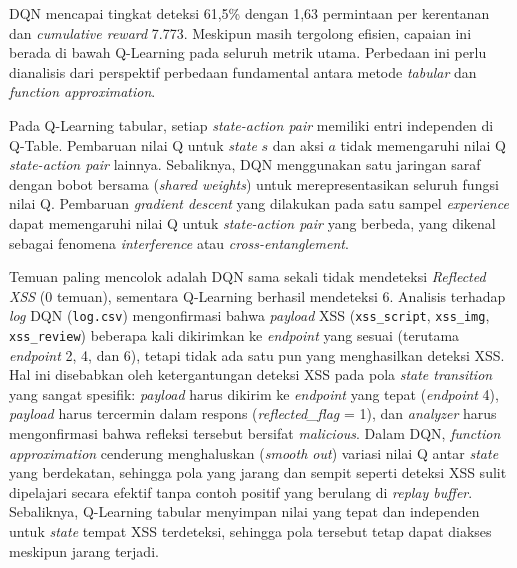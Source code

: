 DQN mencapai tingkat deteksi 61,5\% dengan 1,63 permintaan per kerentanan dan \textit{cumulative reward} 7.773. Meskipun masih tergolong efisien, capaian ini berada di bawah Q-Learning pada seluruh metrik utama. Perbedaan ini perlu dianalisis dari perspektif perbedaan fundamental antara metode \textit{tabular} dan \textit{function approximation}.

Pada Q-Learning tabular, setiap \textit{state-action pair} memiliki entri independen di Q-Table. Pembaruan nilai Q untuk \textit{state} \(s\) dan aksi \(a\) tidak memengaruhi nilai Q \textit{state-action pair} lainnya. Sebaliknya, DQN menggunakan satu jaringan saraf dengan bobot bersama (\textit{shared weights}) untuk merepresentasikan seluruh fungsi nilai Q. Pembaruan \textit{gradient descent} yang dilakukan pada satu sampel \textit{experience} dapat memengaruhi nilai Q untuk \textit{state-action pair} yang berbeda, yang dikenal sebagai fenomena \textit{interference} atau \textit{cross-entanglement}.

Temuan paling mencolok adalah DQN sama sekali tidak mendeteksi \textit{Reflected XSS} (0 temuan), sementara Q-Learning berhasil mendeteksi 6. Analisis terhadap \textit{log} DQN (\texttt{log.csv}) mengonfirmasi bahwa \textit{payload} XSS (\texttt{xss\_script}, \texttt{xss\_img}, \texttt{xss\_review}) beberapa kali dikirimkan ke \textit{endpoint} yang sesuai (terutama \textit{endpoint} 2, 4, dan 6), tetapi tidak ada satu pun yang menghasilkan deteksi XSS. Hal ini disebabkan oleh ketergantungan deteksi XSS pada pola \textit{state transition} yang sangat spesifik: \textit{payload} harus dikirim ke \textit{endpoint} yang tepat (\textit{endpoint} 4), \textit{payload} harus tercermin dalam respons (\textit{reflected\_flag} = 1), dan \textit{analyzer} harus mengonfirmasi bahwa refleksi tersebut bersifat \textit{malicious}. Dalam DQN, \textit{function approximation} cenderung menghaluskan (\textit{smooth out}) variasi nilai Q antar \textit{state} yang berdekatan, sehingga pola yang jarang dan sempit seperti deteksi XSS sulit dipelajari secara efektif tanpa contoh positif yang berulang di \textit{replay buffer}. Sebaliknya, Q-Learning tabular menyimpan nilai yang tepat dan independen untuk \textit{state} tempat XSS terdeteksi, sehingga pola tersebut tetap dapat diakses meskipun jarang terjadi.

